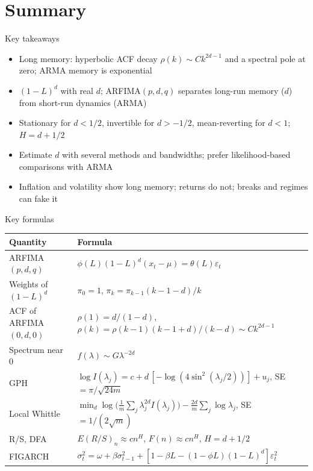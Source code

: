 \section{Summary}

\begin{frame}{Key takeaways}
\itemsize{\small}
\begin{itemize}
    \item Long memory: hyperbolic ACF decay $\rho(k) \sim Ck^{2d-1}$ and a spectral pole at zero; ARMA memory is exponential
    \item $(1-L)^d$ with real $d$; ARFIMA$(p,d,q)$ separates long-run memory ($d$) from short-run dynamics (ARMA)
    \item Stationary for $d < 1/2$, invertible for $d > -1/2$, mean-reverting for $d < 1$; $H = d + 1/2$
    \item Estimate $d$ with several methods and bandwidths; prefer likelihood-based comparisons with ARMA
    \item Inflation and volatility show long memory; returns do not; breaks and regimes can fake it
\end{itemize}
\end{frame}

\begin{frame}{Key formulas}
\itemsize{\small}
{\renewcommand{\arraystretch}{1.35}\begin{center}
\footnotesize
\begin{tabular}{ll}
\toprule
\textbf{Quantity} & \textbf{Formula} \\
\midrule
ARFIMA$(p,d,q)$ & $\phi(L)(1-L)^d(x_t - \mu) = \theta(L)\varepsilon_t$ \\
Weights of $(1-L)^d$ & $\pi_0 = 1$, \quad $\pi_k = \pi_{k-1}(k - 1 - d)/k$ \\
ACF of ARFIMA$(0,d,0)$ & $\rho(1) = d/(1-d)$, \quad $\rho(k) = \rho(k-1)(k-1+d)/(k-d) \sim Ck^{2d-1}$ \\
Spectrum near 0 & $f(\lambda) \sim G\lambda^{-2d}$ \\
GPH & $\log I(\lambda_j) = c + d\,[-\log(4\sin^2(\lambda_j/2))] + u_j$, \quad SE $= \pi/\sqrt{24m}$ \\
Local Whittle & $\min_d \log\bigl(\tfrac1m\sum_j\lambda_j^{2d}I(\lambda_j)\bigr) - \tfrac{2d}{m}\sum_j\log\lambda_j$, \quad SE $= 1/(2\sqrt m)$ \\
R/S, DFA & $E(R/S)_n \approx cn^H$, \quad $F(n) \approx cn^H$, \quad $H = d + 1/2$ \\
FIGARCH & $\sigma_t^2 = \omega + \beta\sigma_{t-1}^2 + [1 - \beta L - (1 - \phi L)(1-L)^d]\varepsilon_t^2$ \\
\bottomrule
\end{tabular}
\end{center}
}
\end{frame}

